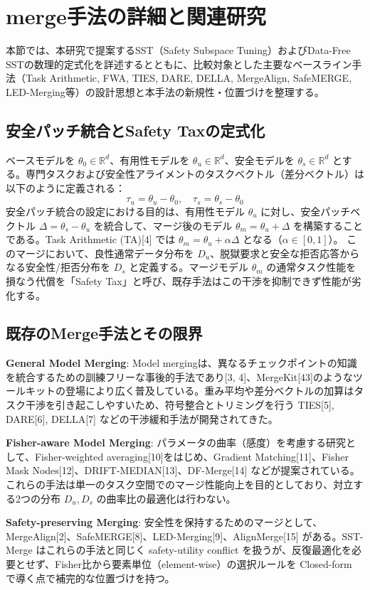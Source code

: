 \section{merge手法の詳細と関連研究}
本節では、本研究で提案するSST（Safety Subspace Tuning）およびData-Free SSTの数理的定式化を詳述するとともに、比較対象とした主要なベースライン手法（Task Arithmetic, FWA, TIES, DARE, DELLA, MergeAlign, SafeMERGE, LED-Merging等）の設計思想と本手法の新規性・位置づけを整理する。

\subsection{安全パッチ統合とSafety Taxの定式化}
ベースモデルを $\theta_0 \in \mathbb{R}^d$、有用性モデルを $\theta_u \in \mathbb{R}^d$、安全モデルを $\theta_s \in \mathbb{R}^d$ とする。専門タスクおよび安全性アライメントのタスクベクトル（差分ベクトル）は以下のように定義される：
\[ \tau_u = \theta_u - \theta_0, \quad \tau_s = \theta_s - \theta_0 \]
安全パッチ統合の設定における目的は、有用性モデル $\theta_u$ に対し、安全パッチベクトル $\Delta = \theta_s - \theta_u$ を統合して、マージ後のモデル $\theta_m = \theta_u + \Delta$ を構築することである。Task Arithmetic (TA)[4] では $\theta_m = \theta_u + \alpha \Delta$ となる（$\alpha \in [0, 1]$）。
このマージにおいて、良性通常データ分布を $D_u$、脱獄要求と安全な拒否応答からなる安全性/拒否分布を $D_s$ と定義する。マージモデル $\theta_m$ の通常タスク性能を損なう代償を「Safety Tax」と呼び、既存手法はこの干渉を抑制できず性能が劣化する。

\subsection{既存のMerge手法とその限界}
\textbf{General Model Merging}: Model mergingは、異なるチェックポイントの知識を統合するための訓練フリーな事後的手法であり[3, 4]、MergeKit[43]のようなツールキットの登場により広く普及している。重み平均や差分ベクトルの加算はタスク干渉を引き起こしやすいため、符号整合とトリミングを行う TIES[5], DARE[6], DELLA[7] などの干渉緩和手法が開発されてきた。

\textbf{Fisher-aware Model Merging}: パラメータの曲率（感度）を考慮する研究として、Fisher-weighted averaging[10]をはじめ、Gradient Matching[11]、Fisher Mask Nodes[12]、DRIFT-MEDIAN[13]、DF-Merge[14] などが提案されている。これらの手法は単一のタスク空間でのマージ性能向上を目的としており、対立する2つの分布 $D_u, D_s$ の曲率比の最適化は行わない。

\textbf{Safety-preserving Merging}: 安全性を保持するためのマージとして、MergeAlign[2]、SafeMERGE[8]、LED-Merging[9]、AlignMerge[15] がある。SST-Merge はこれらの手法と同じく safety-utility conflict を扱うが、反復最適化を必要とせず、Fisher比から要素単位（element-wise）の選択ルールを Closed-form で導く点で補完的な位置づけを持つ。

